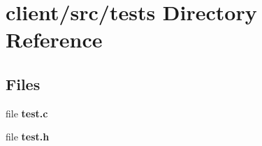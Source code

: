\section{client/src/tests Directory Reference}
\label{dir_de811b7ffca0e00882b9157b28f28080}
\subsection*{Files}
\begin{DoxyCompactItemize}
\item 
file {\bf test.\-c}
\item 
file {\bf test.\-h}
\end{DoxyCompactItemize}
